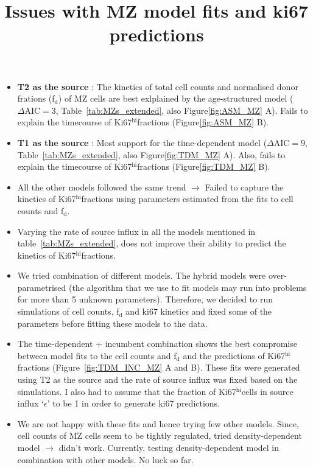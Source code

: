 \documentclass[11pt]{article}
\title{Issues with MZ model fits and ki67 predictions}
\author{}
\date{}
\newcommand{\khi}{Ki67$^\text{hi}$}
\begin{document}
 
\maketitle

\begin{itemize}
	\item \textbf{T2 as the source} : The kinetics of total cell counts and normalised donor frations (f$_\text{d}$) of MZ cells are best exlplained by the age-structured model ($\Delta \text{AIC} = 3$, Table~\ref{tab:MZs_extended}, also Figure\ref{fig:ASM_MZ} A).
	Fails to explain the timecourse of \khi fractions (Figure\ref{fig:ASM_MZ} B).
	
	\item \textbf{T1 as the source} : Most support for the time-dependent model ($\Delta \text{AIC} = 9$, Table~\ref{tab:MZs_extended}, also Figure\ref{fig:TDM_MZ} A).
	Also, fails to explain the timecourse of \khi fractions (Figure\ref{fig:TDM_MZ} B).
	
	\item All the other models followed the same trend $\rightarrow$ Failed to capture the kinetics of \khi fractions using parameters estimated from the fits to cell counts and f$_\text{d}$.
	
	\item Varying the rate of source influx in all the models mentioned in table~\ref{tab:MZs_extended}, does not improve their ability to predict the kinetics of \khi fractions.
	
	\item We tried combination of different models. The hybrid models were over-parametrised (the algorithm that we use to fit models may run into problems for more than 5 unknown parameters). Therefore, we decided to run simulations of cell counts, f$_\text{d}$ and ki67 kinetics and fixed some of the parameters before fitting these models to the data.
	
	\item The time-dependent + incumbent combination shows the best compromise between model fits to the cell counts and f$_\text{d}$ and the predictions of \khi fractions (Figure~\ref{fig:TDM_INC_MZ} A and B). These fits were generated using T2 as the source and the rate of source influx was fixed based on the simulations. I also had to assume that the fraction of \khi cells in source influx `$\epsilon$' to be 1 in order to generate ki67 predictions.
	
	\item We are not happy with these fits and hence trying few other models. Since, cell counts of MZ cells seem to be tightly regulated, tried density-dependent model $\rightarrow$ didn't work. Currently, testing density-dependent model in combination with other models. No luck so far.
	

\end{itemize}
\end{document}
